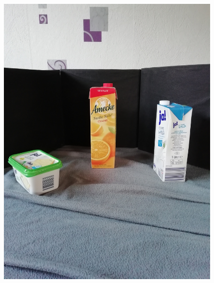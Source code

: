 \documentclass[a4paper,12pt,oneside]{article}
\begin{document}
\begin{figure}[htb]
\begin{minipage}[c]{0.2\textwidth}
\includegraphics[width=\textwidth]{Sources/Bild2.jpg}
\end{minipage}
\hfill
\begin{minipage}[c]{0.08\textwidth}

\end{minipage}
\end{figure}
\end{document}
